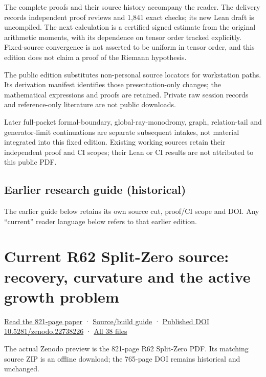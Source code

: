 \documentclass[
]{article}
\begin{document}
The complete proofs and their source history accompany the reader. The
delivery records independent proof reviews and 1,841 exact checks; its
new Lean draft is uncompiled. The next calculation is a certified signed
estimate from the original arithmetic moments, with its dependence on
tensor order tracked explicitly. Fixed-source convergence is not
asserted to be uniform in tensor order, and this edition does not claim
a proof of the Riemann hypothesis.

The public edition substitutes non-personal source locators for
workstation paths. Its derivation manifest identifies those
presentation-only changes; the mathematical expressions and proofs are
retained. Private raw session records and reference-only literature are
not public downloads.

Later full-packet formal-boundary, global-ray-monodromy, graph,
relation-tail and generator-limit continuations are separate subsequent
intakes, not material integrated into this fixed edition. Existing
working sources retain their independent proof and CI scopes; their Lean
or CI results are not attributed to this public PDF.

\subsection{Earlier research guide
(historical)}\label{earlier-research-guide-historical-1}

The earlier guide below retains its own source cut, proof/CI scope and
DOI. Any ``current'' reader language below refers to that earlier
edition.

\section{Current R62 Split-Zero source: recovery, curvature and the
active growth
problem}\label{current-r62-split-zero-source-recovery-curvature-and-the-active-growth-problem}

\href{https://zenodo.org/api/records/22738226/files/37-splitzero-periodized-residue-continuation-821p.pdf/content}{Read
the 821-page paper} ·
\href{workbenches/splitzero-tandem/continuations/20260913-periodized-residue/README.md}{Source/build
guide} · \href{https://doi.org/10.5281/zenodo.22738226}{Published DOI
10.5281/zenodo.22738226} ·
\href{calculation_edition_20260913_periodized_residue/README.md}{All 38
files}

The actual Zenodo preview is the 821-page R62 Split-Zero PDF. Its
matching source ZIP is an offline download; the 765-page DOI remains
historical and unchanged.
\end{document}
